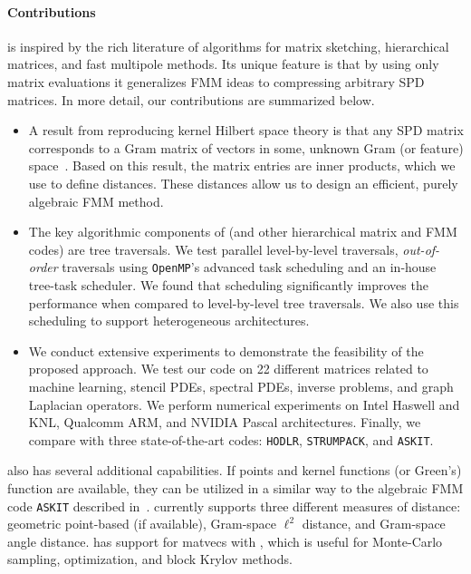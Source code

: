\paragraph{\textbf{Contributions}}
\gofmm{} is inspired by the rich literature of algorithms for matrix sketching, hierarchical matrices, and fast multipole methods.  Its unique feature is that by using only matrix evaluations it generalizes FMM ideas to compressing arbitrary SPD matrices.  In more detail, our contributions are summarized below.
\begin{itemize}[leftmargin=*]\zapspace
  \item A result from reproducing kernel Hilbert space theory is that any SPD
    matrix corresponds to a Gram matrix of vectors in some, unknown Gram (or
    feature) space~\cite{hofmann-scholkopf-smola08}. Based on this result, the matrix entries are inner products, which we use to define distances. These distances allow us to design an efficient, purely algebraic FMM method. 
  \item The key algorithmic components of \gofmm{} (and other hierarchical
    matrix and FMM codes) are tree traversals. %
    We test parallel level-by-level traversals, \emph{out-of-order} traversals
    using \texttt{OpenMP}'s advanced task scheduling and an in-house tree-task scheduler. 
    We found that scheduling significantly improves the performance when compared to 
    level-by-level tree traversals. We also use this scheduling to support heterogeneous architectures. 
  \item We conduct extensive experiments to demonstrate the feasibility of the
    proposed approach. We test our code on 22 different matrices related to
    machine learning, stencil PDEs, spectral PDEs, inverse problems, and graph
    Laplacian operators. We perform numerical experiments on Intel Haswell
    and KNL, Qualcomm ARM, and NVIDIA Pascal architectures. 
    Finally, we compare with three state-of-the-art codes: \texttt{HODLR},
    \texttt{STRUMPACK}, and \texttt{ASKIT}. 
\end{itemize}
\gofmm{} also has several additional capabilities. If points and kernel
functions (or Green's) function are available, they can be utilized in a
similar way to the algebraic FMM code \texttt{ASKIT} described
in~\cite{march-xiao-yu-biros15,march-xiao-biros-fmm-e15}. \gofmm{} currently
supports three different measures of distance: geometric point-based (if
available), Gram-space $\ell^2$ distance, and Gram-space angle distance.  \gofmm{} has support for matvecs with , which is useful for Monte-Carlo sampling, optimization, and block Krylov methods.

